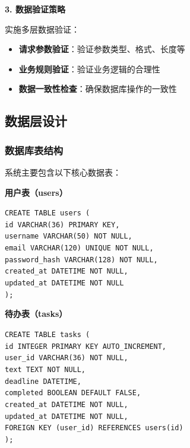 \documentclass[a4paper]{article}
\begin{document}
\textbf{3. 数据验证策略}

实施多层数据验证：

\begin{itemize}
    \item \textbf{请求参数验证}：验证参数类型、格式、长度等
    \item \textbf{业务规则验证}：验证业务逻辑的合理性
    \item \textbf{数据一致性检查}：确保数据库操作的一致性
\end{itemize}

\subsection{数据层设计}

\subsubsection{数据库表结构}

系统主要包含以下核心数据表：

\textbf{用户表（users）}

\texttt{CREATE TABLE users (}\\
\texttt{id VARCHAR(36) PRIMARY KEY,}\\
\texttt{username VARCHAR(50) NOT NULL,}\\
\texttt{email VARCHAR(120) UNIQUE NOT NULL,}\\
\texttt{password\_hash VARCHAR(128) NOT NULL,}\\
\texttt{created\_at DATETIME NOT NULL,}\\
\texttt{updated\_at DATETIME NOT NULL}\\
\texttt{);}

\textbf{待办表（tasks）}

\texttt{CREATE TABLE tasks (}\\
\texttt{id INTEGER PRIMARY KEY AUTO\_INCREMENT,}\\
\texttt{user\_id VARCHAR(36) NOT NULL,}\\
\texttt{text TEXT NOT NULL,}\\
\texttt{deadline DATETIME,}\\
\texttt{completed BOOLEAN DEFAULT FALSE,}\\
\texttt{created\_at DATETIME NOT NULL,}\\
\texttt{updated\_at DATETIME NOT NULL,}\\
\texttt{FOREIGN KEY (user\_id) REFERENCES users(id)}\\
\texttt{);}
\end{document}
